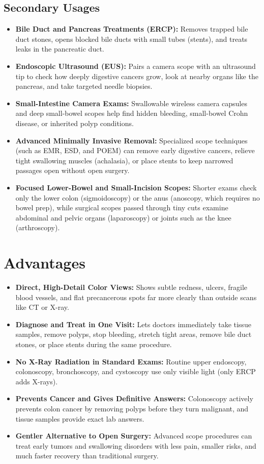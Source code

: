 \subsection{Secondary Usages}
\begin{itemize}
\item \textbf{Bile Duct and Pancreas Treatments (ERCP):} Removes trapped bile duct stones, opens blocked bile ducts with small tubes (stents), and treats leaks in the pancreatic duct.
\item \textbf{Endoscopic Ultrasound (EUS):} Pairs a camera scope with an ultrasound tip to check how deeply digestive cancers grow, look at nearby organs like the pancreas, and take targeted needle biopsies.
\item \textbf{Small-Intestine Camera Exams:} Swallowable wireless camera capsules and deep small-bowel scopes help find hidden bleeding, small-bowel Crohn disease, or inherited polyp conditions.
\item \textbf{Advanced Minimally Invasive Removal:} Specialized scope techniques (such as EMR, ESD, and POEM) can remove early digestive cancers, relieve tight swallowing muscles (achalasia), or place stents to keep narrowed passages open without open surgery.
\item \textbf{Focused Lower-Bowel and Small-Incision Scopes:} Shorter exams check only the lower colon (sigmoidoscopy) or the anus (anoscopy, which requires no bowel prep), while surgical scopes passed through tiny cuts examine abdominal and pelvic organs (laparoscopy) or joints such as the knee (arthroscopy).
\end{itemize}

\section{Advantages}
\begin{itemize}
\item \textbf{Direct, High-Detail Color Views:} Shows subtle redness, ulcers, fragile blood vessels, and flat precancerous spots far more clearly than outside scans like CT or X-ray.
\item \textbf{Diagnose and Treat in One Visit:} Lets doctors immediately take tissue samples, remove polyps, stop bleeding, stretch tight areas, remove bile duct stones, or place stents during the same procedure.
\item \textbf{No X-Ray Radiation in Standard Exams:} Routine upper endoscopy, colonoscopy, bronchoscopy, and cystoscopy use only visible light (only ERCP adds X-rays).
\item \textbf{Prevents Cancer and Gives Definitive Answers:} Colonoscopy actively prevents colon cancer by removing polyps before they turn malignant, and tissue samples provide exact lab answers.
\item \textbf{Gentler Alternative to Open Surgery:} Advanced scope procedures can treat early tumors and swallowing disorders with less pain, smaller risks, and much faster recovery than traditional surgery.
\end{itemize}

